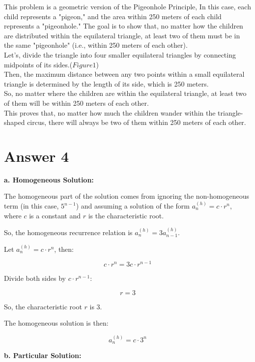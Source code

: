 \documentclass[12pt]{article}
\begin{document}
    This problem is a geometric version of the Pigeonhole Principle, In this case, each child represents a "pigeon," and the area within 250 meters of each child represents a "pigeonhole." The goal is to show that, no matter how the children are distributed within the equilateral triangle, at least two of them must be in the same "pigeonhole" (i.e., within 250 meters of each other). \\

    Let's, divide the triangle into four smaller equilateral triangles by connecting midpoints of its sides.(\( Figure 1 \))\\

    Then, the maximum distance between any two points within a small equilateral triangle is determined by the length of its side, which is 250 meters.\\

    So, no matter where the children are within the equilateral triangle, at least two of them will be within 250 meters of each other.\\

    This proves that, no matter how much the children wander within the triangle-shaped circus, there will always be two of them within 250 meters of each other.\\

\section*{Answer 4}
\textbf{a. Homogeneous Solution:}

The homogeneous part of the solution comes from ignoring the non-homogeneous term (in this case, \(5^{n-1}\)) and assuming a solution of the form \(a_n^{(h)} = c \cdot r^n\), where \(c\) is a constant and \(r\) is the characteristic root.

So, the homogeneous recurrence relation is \(a_n^{(h)} = 3a_{n-1}^{(h)}\).

Let \(a_n^{(h)} = c \cdot r^n\), then:

\[c \cdot r^n = 3c \cdot r^{n-1}\]

Divide both sides by \(c \cdot r^{n-1}\):

\[r = 3\]

So, the characteristic root \(r\) is 3.

The homogeneous solution is then:

\[a_n^{(h)} = c \cdot 3^n\]

\textbf{b. Particular Solution:}
\end{document}
